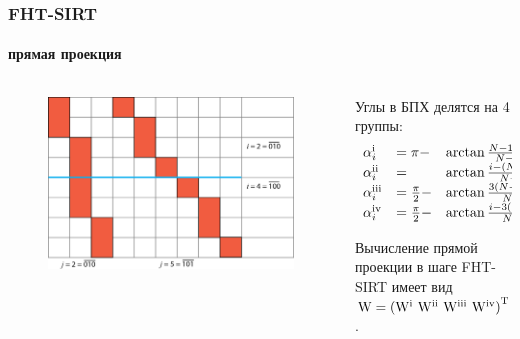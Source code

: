 \documentclass[12pt]{beamer}
\newcommand{\rom}[1]{%
  \textup{\uppercase\expandafter{\romannumeral#1}}%
}
\begin{document}
\begin{frame}
\frametitle{FHT-SIRT}
\framesubtitle{прямая проекция}
\begin{columns}[T,onlytextwidth]
  \hspace*{-0.5cm}
  \begin{column}{0.65\textwidth}
  \begin{figure}
    \includegraphics[width=\textwidth]{../Dissertation/images/part1_img/pattern_structure}
  \end{figure}
  \end{column}
  \begin{column}{0.45\textwidth}
    Углы в БПХ делятся на 4 группы:
    \begin{equation} \notag
    \begin{array}{lll}
    \alpha^\rom{1}_i &= \pi - & \arctan{\frac{N-1-i}{N-1}} \\
    \alpha^\rom{2}_i &= &\arctan{\frac{i - (N-1)}{N-1}} \\
    \alpha^\rom{3}_i &= \frac \pi 2 - & \arctan{\frac{3(N-1)-i}{N-1}} \\
    \alpha^\rom{4}_i &= \frac \pi 2 - & \arctan{\frac{i - 3(N-1)}{N-1}}
    \end{array}
    \end{equation}

    Вычисление прямой проекции в шаге FHT-SIRT имеет вид 
        $\mathrm W = \left( \mathrm  W^\rom{1}\ \mathrm W^\rom{2}\ \mathrm  W^\rom{3}\ \mathrm  W^\rom{4} \right)^{\mathrm T}$.
  \end{column}
\end{columns}
\end{frame}
\end{document}
